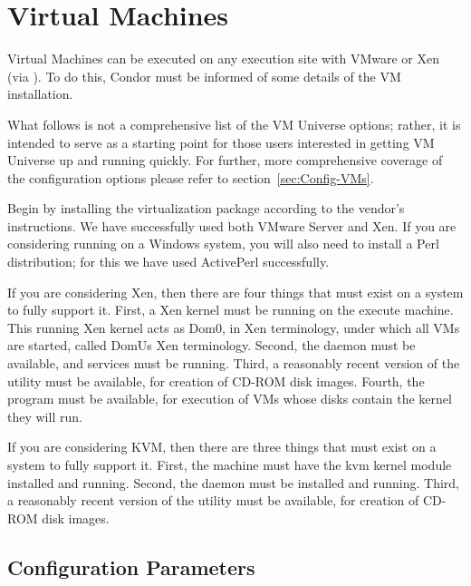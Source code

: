 \section{\label{sec:vm-install}Virtual Machines}


Virtual Machines can be executed on any execution site with VMware or Xen
(via ).  To do this, Condor must be informed of some details 
of the VM installation.

What follows is not a comprehensive list of the VM Universe options; rather,
it is intended to serve as a starting point for those users interested in
getting VM Universe up and running quickly.  For further, more comprehensive 
coverage of the configuration options please refer to 
section~\ref{sec:Config-VMs}.

Begin by installing the virtualization package according to the vendor's
instructions.  We have successfully used both VMware Server and Xen. If you
are considering running on a Windows system, you will also need to install
a Perl distribution; for this we have used ActivePerl successfully. 

If you are considering Xen, then there are four things that must exist on 
a system to fully support it. First, a Xen kernel must be running on the 
execute machine. This running Xen kernel acts as Dom0, in Xen terminology, 
under which all VMs are started, called DomUs Xen terminology. Second, 
the  daemon must be available, and  services must be running. 
Third, a reasonably recent version of the  utility must be available, 
for creation of CD-ROM disk images. Fourth, the  program must be 
available, for execution of VMs whose disks contain the kernel they will run.

If you are considering KVM, then there are three things that must exist on a 
system to fully support it.  First, the machine must have the kvm kernel 
module installed and running.  Second, the  daemon must be 
installed and running.  Third, a reasonably recent version of the  
utility must be available, for creation of CD-ROM disk images.

\subsection{Configuration Parameters}

